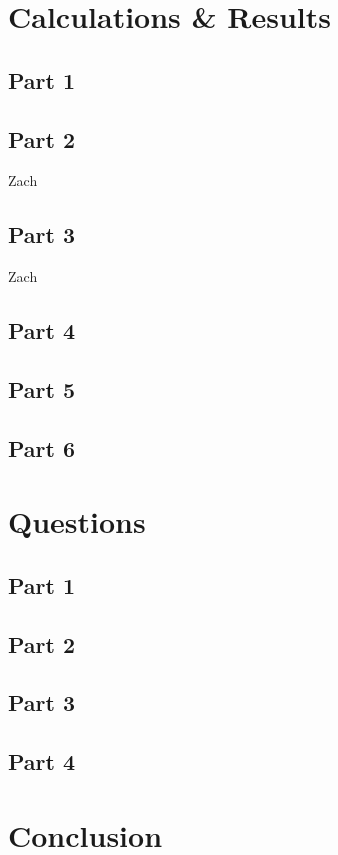 \documentclass[titlepage]{article}
\begin{document}
    \section{Calculations & Results}

        \subsection{Part 1} 

        \subsection{Part 2} 
        Zach

        \subsection{Part 3} 
        Zach

        \subsection{Part 4} 
        \subsection{Part 5} 
        \subsection{Part 6} 


	\section{Questions}


    	\subsection{Part 1}

    
    	\subsection{Part 2}

    
        \subsection{Part 3}
    	
        \subsection{Part 4}
    
  	\section{Conclusion}
\end{document}
